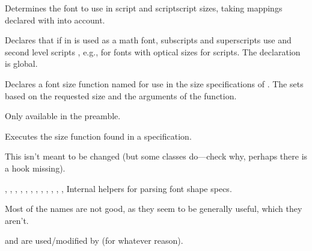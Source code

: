 \documentclass{l3in2edoc}
\begin{document}
\begin{function}[int]
  {
    \transform@scriptfont
  }
  Determines the font to use in script and scriptscript sizes, taking
  mappings declared with  into
  account.
\end{function}


\begin{function}[user]
  {
    \DeclareMathScriptfontMapping
  }
  \begin{syntax}
          
  \end{syntax}
  Declares that if  in  is used as a math font,
  subscripts and superscripts use  and second
  level scripts , e.g., for fonts with optical
  sizes for scripts. The declaration is global.
\end{function}





\begin{function}[]
  {
    \DeclareSizeFunction
  }
  \begin{syntax}
      
  \end{syntax}
  Declares a font size function named  for use in the size
  specifications of . The  sets
   based on the requested size and the arguments
  of the function.

  Only available in the preamble.
\end{function}



\begin{function}[int]
  {
    \execute@size@function
  }
  Executes the size function found in a 
  specification.

  This isn't meant to be changed (but some classes do---check why,
  perhaps there is a hook missing).
\end{function}




\begin{function}[int]
  {
    \check@range,
    \check@single,
    \extract@rangefontinfo,
    \genb@x,
    \genb@y,
    \is@range,
    \remove@angles,
    \set@size@funct@args,
    \set@size@funct@args@,
    \try@size@range,
    \try@size@substitution,
    \try@simples,
    \tryif@simple
  }
  Internal helpers for parsing font shape specs.

  Most of the names are not good, as they
  seem to be generally useful, which they aren't.

   and  are used/modified by
   (for whatever reason).
\end{function}
\end{document}
